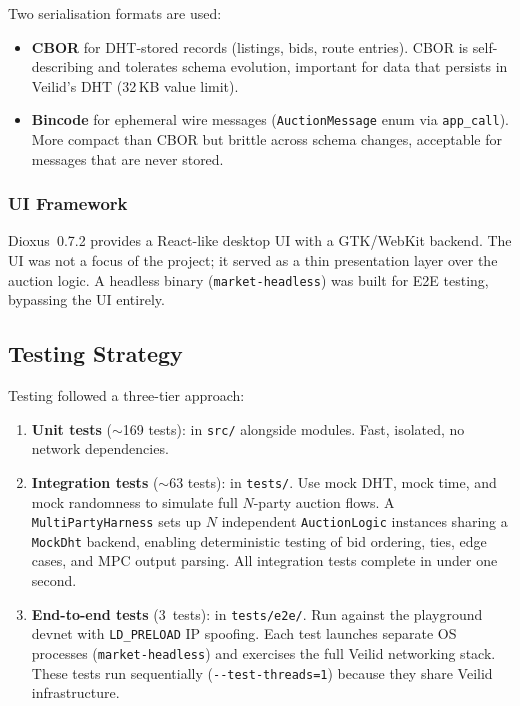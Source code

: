 Two serialisation formats are used:
\begin{itemize}[noitemsep]
  \item \textbf{CBOR} for DHT-stored records (listings, bids, route entries).
    CBOR is self-describing and tolerates schema evolution, important for
    data that persists in Veilid's DHT (32\,KB value limit).
  \item \textbf{Bincode} for ephemeral wire messages
    (\texttt{AuctionMessage} enum via \texttt{app\_call}).  More compact than
    CBOR but brittle across schema changes, acceptable for messages that are
    never stored.
\end{itemize}

\subsubsection{UI Framework}

Dioxus~0.7.2 provides a React-like desktop UI with a GTK/WebKit backend.
The UI was not a focus of the project; it served as a thin presentation layer
over the auction logic.  A headless binary (\texttt{market-headless}) was
built for E2E testing, bypassing the UI entirely.

\subsection{Testing Strategy}
\label{sec:method-testing}

Testing followed a three-tier approach:

\begin{enumerate}
  \item \textbf{Unit tests} (${\sim}$169 tests): in \texttt{src/} alongside
    modules.  Fast, isolated, no network dependencies.
  \item \textbf{Integration tests} (${\sim}$63 tests): in \texttt{tests/}.
    Use mock DHT, mock time, and mock randomness to simulate full $N$-party
    auction flows.  A \texttt{MultiPartyHarness} sets up $N$ independent
    \texttt{AuctionLogic} instances sharing a \texttt{MockDht} backend,
    enabling deterministic testing of bid ordering, ties, edge cases, and
    MPC output parsing.  All integration tests complete in under one second.
  \item \textbf{End-to-end tests} (3~tests): in \texttt{tests/e2e/}.  Run
    against the playground devnet with \texttt{LD\_PRELOAD} IP spoofing.  Each
    test launches separate OS processes (\texttt{market-headless}) and
    exercises the full Veilid networking stack.  These tests run sequentially
    (\texttt{-{}-test-threads=1}) because they share Veilid infrastructure.
\end{enumerate}

